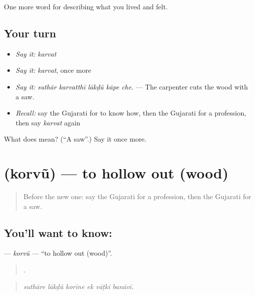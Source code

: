 \begin{grammarlens}[title={What you've built}]
One more word for describing what you lived and felt.
\end{grammarlens}

\subsection*{Your turn}
\begin{itemize}
\raggedright
  \item \emph{Say it:} \emph{karvat}
  \item \emph{Say it:} \emph{karvat}, once more
  \item \emph{Say it:} \emph{suthār karvatthī lākḍũ kāpe che.} — The carpenter cuts the wood with a saw.
  \item \emph{Recall:} say the Gujarati for to know how, then the Gujarati for a profession, then say \emph{karvat} again
\end{itemize}

\begin{tcolorbox}[breakable,colback=teal!4,colframe=teal!35!black,title={Before you move on}]
What does  mean? (\textquotedblleft{}A saw\textquotedblright{}.) Say it once more.
\end{tcolorbox}
\section[\texorpdfstring{\gu{કોરવું} (korvũ)}{કોરવું (korvũ)}]{ (korvũ) — to hollow out (wood)}

\label{lesson:GU-C502-korvu}



\begin{quote}
Before the new one: say the Gujarati for a profession, then the Gujarati for a saw.
\end{quote}

\subsection*{You'll want to know: }
\textbf{} — \emph{korvũ} — \textquotedblleft{}to hollow out (wood)\textquotedblright{}.

\begin{quote}
     .
\end{quote}

\begin{quote}
\emph{suthāre lākḍũ korīne ek vāṭkī banāvī.}
\end{quote}

